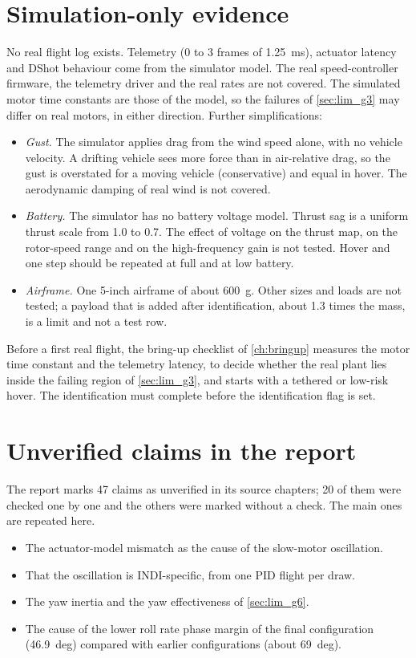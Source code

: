 \section{Simulation-only evidence}\label{sec:lim_sim}

No real flight log exists.
Telemetry (0 to 3 frames of 1.25~ms), actuator latency and DShot behaviour come from the simulator model.
The real speed-controller firmware, the telemetry driver and the real rates are not covered.
The simulated motor time constants are those of the model, so the failures of \cref{sec:lim_g3} may differ on real motors, in either direction.
Further simplifications:
\begin{itemize}
  \item \emph{Gust.} The simulator applies drag from the wind speed alone, with no vehicle velocity. A drifting vehicle sees more force than in air-relative drag, so the gust is overstated for a moving vehicle (conservative) and equal in hover. The aerodynamic damping of real wind is not covered.
  \item \emph{Battery.} The simulator has no battery voltage model. Thrust sag is a uniform thrust scale from 1.0 to 0.7. The effect of voltage on the thrust map, on the rotor-speed range and on the high-frequency gain is not tested. Hover and one step should be repeated at full and at low battery.
  \item \emph{Airframe.} One 5-inch airframe of about 600~g. Other sizes and loads are not tested; a payload that is added after identification, about 1.3 times the mass, is a limit and not a test row.
\end{itemize}

Before a first real flight, the bring-up checklist of \cref{ch:bringup} measures the motor time constant and the telemetry latency, to decide whether the real plant lies inside the failing region of \cref{sec:lim_g3}, and starts with a tethered or low-risk hover.
The identification must complete before the identification flag is set.

\section{Unverified claims in the report}\label{sec:lim_unverified}

The report marks 47 claims as unverified in its source chapters; 20 of them were checked one by one and the others were marked without a check.
The main ones are repeated here.
\begin{itemize}
  \item The actuator-model mismatch as the cause of the slow-motor oscillation.
  \item That the oscillation is INDI-specific, from one PID flight per draw.
  \item The yaw inertia and the yaw effectiveness of \cref{sec:lim_g6}.
  \item The cause of the lower roll rate phase margin of the final configuration (46.9~deg) compared with earlier configurations (about 69~deg).
\end{itemize}
